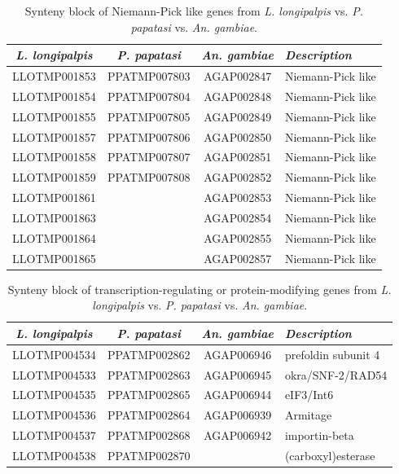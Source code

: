 \begin{table}[H]
  \centering
  \begin{tabular}{c c c l} \hline
    \emph{L. longipalpis} & \emph{P. papatasi} & \emph{An. gambiae} & \emph{Description} \\ \hline
    LLOTMP001853 & PPATMP007803 & AGAP002847 & Niemann-Pick like \\
    LLOTMP001854 & PPATMP007804 & AGAP002848 & Niemann-Pick like \\
    LLOTMP001855 & PPATMP007805 & AGAP002849 & Niemann-Pick like \\
    LLOTMP001857 & PPATMP007806 & AGAP002850 & Niemann-Pick like \\
    LLOTMP001858 & PPATMP007807 & AGAP002851 & Niemann-Pick like \\
    LLOTMP001859 & PPATMP007808 & AGAP002852 & Niemann-Pick like \\
    LLOTMP001861 & & AGAP002853 & Niemann-Pick like \\
    LLOTMP001863 & & AGAP002854 & Niemann-Pick like \\
    LLOTMP001864 & & AGAP002855 & Niemann-Pick like \\
    LLOTMP001865 & & AGAP002857 & Niemann-Pick like
    \end{tabular}
    \caption{Synteny block of Niemann-Pick like genes from \emph{L. longipalpis} vs. \emph{P. papatasi} vs. \emph{An. gambiae}.}
  \label{tab:synteny-three-way-np2}
\end{table}

\begin{table}[H]
  \centering
  \begin{tabular}{c c c l} \hline
    \emph{L. longipalpis} & \emph{P. papatasi} & \emph{An. gambiae} & \emph{Description} \\ \hline
    LLOTMP004534 & PPATMP002862 & AGAP006946 & prefoldin subunit 4 \\
    LLOTMP004533 & PPATMP002863 & AGAP006945 & okra/SNF-2/RAD54 \\
    LLOTMP004535 & PPATMP002865 & AGAP006944 & eIF3/Int6 \\
    LLOTMP004536 & PPATMP002864 & AGAP006939 & Armitage \\
    LLOTMP004537 & PPATMP002868 & AGAP006942 & importin-beta \\
    LLOTMP004538 & PPATMP002870 & & (carboxyl)esterase
    \end{tabular}
    \caption{Synteny block of transcription-regulating or protein-modifying genes from \emph{L. longipalpis} vs. \emph{P. papatasi} vs. \emph{An. gambiae}.}
  \label{tab:synteny-three-way-transcription}
\end{table}

